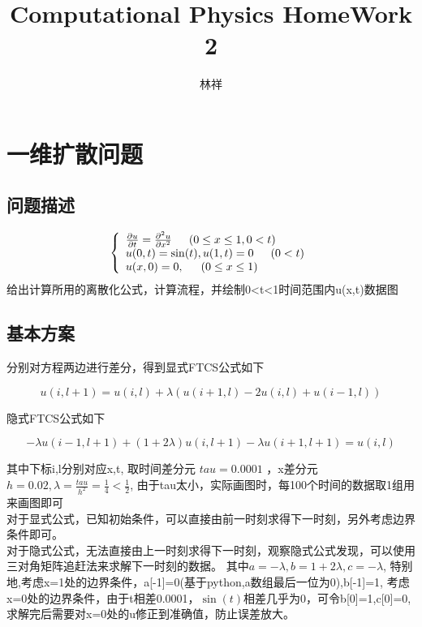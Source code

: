 \documentclass[11pt]{ctexart}
\title{Computational Physics HomeWork 2}
\author{林祥}
\begin{document}
\maketitle
\section{一维扩散问题}

\subsection{问题描述}

\begin{equation}
\left\lbrace 
\begin{array}{l}
\frac{\partial u}{\partial t}=\frac{\partial^{2}u}{\partial x^{2}} \indent (0\leq x\leq 1, 0<t)\\
u(0,t)=\sin (t),u(1,t)=0 \indent (0<t)\\
u(x,0)=0, \indent (0\leq x\leq 1) 
\end{array}
\right. 
\end{equation}
给出计算所用的离散化公式，计算流程，并绘制0<t<1时间范围内u(x,t)数据图

\subsection{基本方案}

分别对方程两边进行差分，得到显式FTCS公式如下

\begin{equation}
u(i,l+1)=u(i,l)+\lambda(u(i+1,l)-2u(i,l)+u(i-1,l))
\end{equation}

\indent 隐式FTCS公式如下

\begin{equation}
-\lambda u(i-1,l+1)+(1+2\lambda)u(i,l+1)-\lambda u(i+1,l+1)=u(i,l)
\end{equation}

\indent 其中下标i,l分别对应x,t, 取时间差分元 $ tau=0.0001 $ ，x差分元$ h=0.02 ,\lambda=\frac{tau}{h^2}=\frac{1}{4}<\frac{1}{2}$,
由于tau太小，实际画图时，每100个时间的数据取1组用来画图即可\\
\indent 对于显式公式，已知初始条件，可以直接由前一时刻求得下一时刻，另外考虑边界条件即可。\\
\indent 对于隐式公式，无法直接由上一时刻求得下一时刻，观察隐式公式发现，可以使用三对角矩阵追赶法来求解下一时刻的数据。
其中$a=-\lambda,b=1+2\lambda,c=-\lambda$,
特别地,考虑x=1处的边界条件，a[-1]=0(基于python,a数组最后一位为0),b[-1]=1,
考虑x=0处的边界条件，由于t相差0.0001，$\sin(t)$相差几乎为0，可令b[0]=1,c[0]=0,
求解完后需要对x=0处的u修正到准确值，防止误差放大。
\end{document}
